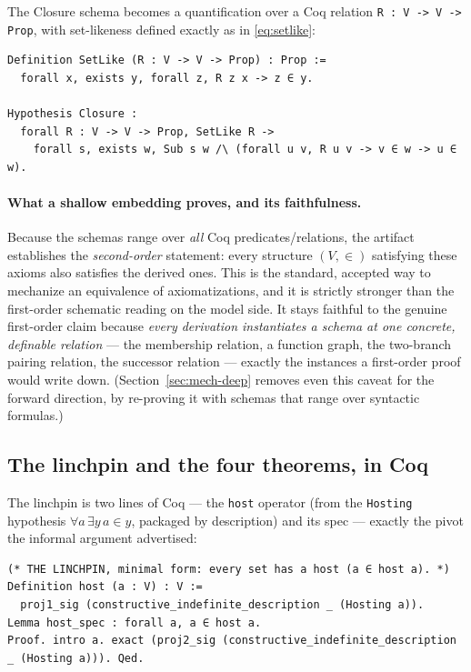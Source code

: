\documentclass[11pt]{article}
\theoremstyle{plain}
\theoremstyle{definition}
\newcommand{\cq}[1]{\lstinline[basicstyle=\ttfamily]|#1|}
\begin{document}
The Closure schema becomes a quantification over a Coq relation
\cq{R : V -> V -> Prop}, with set-likeness defined exactly as in
\eqref{eq:setlike}:

\begin{lstlisting}
Definition SetLike (R : V -> V -> Prop) : Prop :=
  forall x, exists y, forall z, R z x -> z ∈ y.

Hypothesis Closure :
  forall R : V -> V -> Prop, SetLike R ->
    forall s, exists w, Sub s w /\ (forall u v, R u v -> v ∈ w -> u ∈ w).
\end{lstlisting}

\paragraph{What a shallow embedding proves, and its faithfulness.} Because the
schemas range over \emph{all} Coq predicates/relations, the artifact establishes
the \emph{second-order} statement: every structure $(V,\in)$ satisfying these
axioms also satisfies the derived ones. This is the standard, accepted way to
mechanize an equivalence of axiomatizations, and it is strictly stronger than the
first-order schematic reading on the model side. It stays faithful to the genuine
first-order claim because \emph{every derivation instantiates a schema at one
concrete, definable relation} --- the membership relation, a function graph, the
two-branch pairing relation, the successor relation --- exactly the instances a
first-order proof would write down. (Section~\ref{sec:mech-deep} removes even this
caveat for the forward direction, by re-proving it with schemas that range over
syntactic formulas.)

\subsection{The linchpin and the four theorems, in Coq}

The linchpin is two lines of Coq --- the \cq{host} operator (from the \cq{Hosting}
hypothesis $\forall a\,\exists y\,a\in y$, packaged by description) and its spec ---
exactly the pivot the informal argument advertised:

\begin{lstlisting}
(* THE LINCHPIN, minimal form: every set has a host (a ∈ host a). *)
Definition host (a : V) : V :=
  proj1_sig (constructive_indefinite_description _ (Hosting a)).
Lemma host_spec : forall a, a ∈ host a.
Proof. intro a. exact (proj2_sig (constructive_indefinite_description _ (Hosting a))). Qed.
\end{lstlisting}
\end{document}

